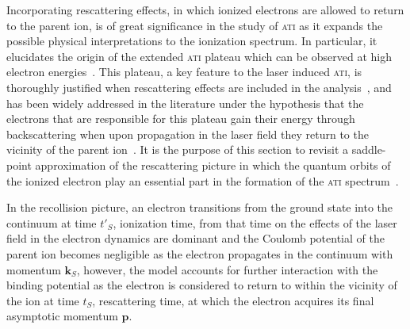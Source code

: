 Incorporating rescattering effects, in which ionized electrons are
allowed to return to the parent ion, is of great significance in the
study of \textsc{ati} as it expands the possible physical
interpretations to the ionization spectrum. In particular, it
elucidates the origin of the extended \textsc{ati} plateau which can
be observed at high electron energies~\cite{Walker_1996}. This
plateau, a key feature to the laser induced \textsc{ati}, is
thoroughly justified when rescattering effects are included in the
analysis~\cite{Paulus_1994plateau,BeckerRescattering_2018}, and has
been widely addressed in the literature under the hypothesis that the
electrons that are responsible for this plateau gain their energy
through backscattering when upon propagation in the laser field they
return to the vicinity of the parent
ion~\cite{Paulus_1994plateau,Becker_1994plateau_classical,Becker_rescattering1994}. It
is the purpose of this section to revisit a saddle-point approximation
of the rescattering picture in which the quantum orbits of the ionized
electron play an essential part in the formation of the \textsc{ati}
spectrum~\cite{KopoldOptComm2000}.




In the recollision picture, an electron transitions from the ground
state into the continuum at time $t'_{S}$, ionization time, from that
time on the effects of the laser field in the electron dynamics are
dominant and the Coulomb potential of the parent ion becomes
negligible as the electron propagates in the continuum with momentum
$\mathbf{k}_{S}$, however, the model accounts for further interaction
with the binding potential as the electron is considered to return to
within the vicinity of the ion at time $t_{S}$, rescattering time, at
which the electron acquires its final asymptotic momentum
$\mathbf{p}$.

